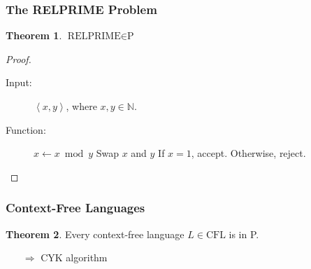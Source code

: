 \documentclass[notheorems]{beamer}
\theoremstyle{definition}
\newtheorem{theorem}{Theorem}
\theoremstyle{remark}
\newcommand{\pclass}{\text{P}}
\newcommand{\relprimeprob}{\text{RELPRIME}}
\newcommand{\cflclass}{\text{CFL}}
\newcommand{\lpp}{\left \langle}
\newcommand{\rpp}{\right \rangle}
\newcommand{\enc}[1]{\lpp #1 \rpp }
\begin{document}
    \begin{frame}
        \frametitle{The RELPRIME Problem}

        \begin{theorem}
            \(\relprimeprob \in \pclass\)
        \end{theorem}

        \pause
    
        \begin{proof}
            \begin{description}
                \item[Input:] \(\enc{x, y}\), where \(x, y \in \mathbb{N}\).
                \item[Function:] \phantom{}
                \begin{algorithmic}[1]
                        \State \(x \gets x\bmod{y}\)
                        \State Swap \(x\) and \(y\)
                    \EndWhile
                    \State If \(x = 1\), accept. Otherwise, reject.
                \end{algorithmic}
            \end{description}
        \end{proof}
    
    \end{frame}

    \begin{frame}
        \frametitle{Context-Free Languages}
    
        \begin{theorem}
            Every context-free language \(L \in \cflclass\) is in P.
        \end{theorem}

        \begin{itemize}
            \item[\(\Rightarrow\)] CYK algorithm
        \end{itemize}
    
    \end{frame}
\end{document}
